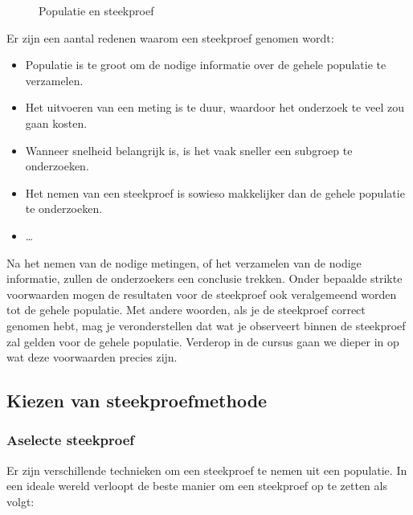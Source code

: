 \begin{figure}
  \begin{center}
  \end{center}
  \caption{Populatie en steekproef}
  \label{img:populatie-steekproef}
\end{figure}

Er zijn een aantal redenen waarom een steekproef genomen wordt:

\begin{itemize}
  \item Populatie is te groot om de nodige informatie over de gehele populatie te verzamelen.
  \item Het uitvoeren van een meting is te duur, waardoor het onderzoek te veel zou gaan kosten.
  \item Wanneer snelheid belangrijk is, is het vaak sneller een subgroep te onderzoeken.
  \item Het nemen van een steekproef is sowieso makkelijker dan de gehele populatie te onderzoeken.
  \item \dots
\end{itemize}

Na het nemen van de nodige metingen, of het verzamelen van de nodige informatie, zullen de onderzoekers een conclusie trekken. Onder bepaalde strikte voorwaarden mogen de resultaten voor de steekproef ook veralgemeend worden tot de gehele populatie. Met andere woorden, als je de steekproef correct genomen hebt, mag je veronderstellen dat wat je observeert binnen de steekproef zal gelden voor de gehele populatie. Verderop in de cursus gaan we dieper in op wat deze voorwaarden precies zijn.

\subsection{Kiezen van steekproefmethode}

\subsubsection{Aselecte steekproef}

Er zijn verschillende technieken om een steekproef te nemen uit een populatie. In een ideale wereld verloopt de beste manier om een steekproef op te zetten als volgt:

